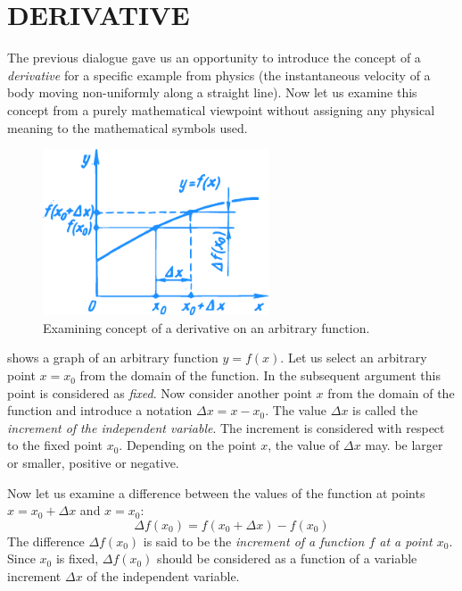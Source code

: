 

\chapter{DERIVATIVE}
\label{derivative}

\athr The previous dialogue gave us an opportunity to introduce the concept of a \emph{derivative} for a specific example from physics (the instantaneous velocity of a body moving non-uniformly along a straight line). Now let us examine this concept from a purely mathematical viewpoint without assigning any physical meaning to the mathematical symbols used.

\begin{figure}[!ht]%
\centering
\includegraphics[width=0.6\textwidth]{figures/fig-36.pdf}
\caption{Examining concept of a derivative on an arbitrary function.}
\label{fig-36}
\end{figure}

 shows a graph of an arbitrary function $y = f (x)$. Let us select an arbitrary point $x= x_{0}$ from the domain of the function. In the subsequent argument this point is considered as \emph{fixed}. Now consider another point $x$ from the domain of the function and introduce a notation $\Delta x = x -	x_{0}$. The value $\Delta x$ is called the \emph{increment of the independent variable}. The increment is considered with respect to the fixed point $x_{0}$. Depending on the point $x$, the value of $\Delta x$ may. be larger or smaller, positive or negative.

Now let us examine a difference between the values of the function at points $x = x_{0} + \Delta x$ and $x = x_{0}$:
\begin{equation*}%
\Delta f (x_{0}) = f (x_{0} + \Delta x) - f(x_{0})
\end{equation*}
The difference  $\Delta f (x_{0})$ is said to be the \emph{increment of a function $f$ at a point $x_{0}$}. Since $x_{0}$ is fixed, $\Delta f (x_{0})$ should be considered as a function of a variable increment $\Delta x$ of the independent variable.

